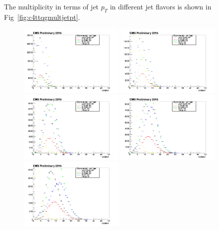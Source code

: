 The multiplicity in terms of jet $p_{T}$ in different jet flavors is shown in Fig~\ref{fig:c4ttqgmultjetpt}.
\begin{figure}[htbp]
 \begin{center}
  \includegraphics[width=0.45\textwidth]{sections/mc4/TopTagger/figures/_b_qgmultjetptbin0_.png}
  \includegraphics[width=0.45\textwidth]{sections/mc4/TopTagger/figures/_b_qgmultjetptbin1_.png} \\
  \includegraphics[width=0.45\textwidth]{sections/mc4/TopTagger/figures/_b_qgmultjetptbin2_.png}
  \includegraphics[width=0.45\textwidth]{sections/mc4/TopTagger/figures/_b_qgmultjetptbin3_.png} \\
  \includegraphics[width=0.45\textwidth]{sections/mc4/TopTagger/figures/_b_qgmultjetptbin4_.png}

\end{center}
\end{figure}
